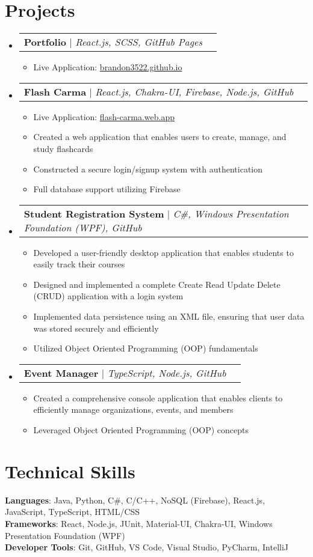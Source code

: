 \documentclass[letterpaper,11pt]{article}
\makeatletter
\newcommand{\resumeItem}[1]{
  \item\small{
    {#1 \vspace{-2pt}}
  }
}
\newcommand{\resumeProjectHeading}[2]{
    \item
    \begin{tabular*}{0.97\textwidth}{l@{\extracolsep{\fill}}r}
      \small#1 & #2 \\
    \end{tabular*}\vspace{-7pt}
}
\newcommand{\resumeSubHeadingListStart}{\begin{itemize}[leftmargin=0.15in, label={}]}
\newcommand{\resumeSubHeadingListEnd}{\end{itemize}}
\newcommand{\resumeItemListStart}{\begin{itemize}}
\newcommand{\resumeItemListEnd}{\end{itemize}\vspace{-5pt}}
\makeatother
\begin{document}
\section{Projects}
    \resumeSubHeadingListStart
      \resumeProjectHeading
          {\textbf{Portfolio} $|$ \emph{React.js, SCSS, GitHub Pages}}{}
					\resumeItemListStart
						\resumeItem{Live Application: \href{https://brandon3522.github.io}{brandon3522.github.io}}
          \resumeItemListEnd
      \resumeProjectHeading
          {\textbf{Flash Carma} $|$ \emph{React.js, Chakra-UI, Firebase, Node.js, GitHub}}{}
          \resumeItemListStart
					\resumeItem{Live Application: \href{https://flash-carma.web.app}{flash-carma.web.app}}
						\resumeItem{Created a web application that enables users to create, manage, and study flashcards}
						\resumeItem{Constructed a secure login/signup system with authentication}
						\resumeItem{Full database support utilizing Firebase}
          \resumeItemListEnd
					\resumeProjectHeading
          {\textbf{Student Registration System} $|$ \emph{C\#, Windows Presentation Foundation (WPF), GitHub}}{}
          \resumeItemListStart
						\resumeItem{Developed a user-friendly desktop application that enables students to easily track their courses}
						\resumeItem{Designed and implemented a complete Create Read Update Delete (CRUD) application with a login system}
						\resumeItem{Implemented data persistence using an XML file, ensuring that user data was stored securely and efficiently}
						\resumeItem{Utilized Object Oriented Programming (OOP) fundamentals}
          \resumeItemListEnd
			\resumeProjectHeading
          {\textbf{Event Manager} $|$ \emph{TypeScript, Node.js, GitHub}}{}
          \resumeItemListStart
						\resumeItem{Created a comprehensive console application that enables clients to efficiently manage organizations, events, and members}
						\resumeItem{Leveraged Object Oriented Programming (OOP) concepts}
          \resumeItemListEnd
    \resumeSubHeadingListEnd



%
\section{Technical Skills}
 \begin{itemize}[leftmargin=0.15in, label={}]
    \small{\item{
     \textbf{Languages}{: Java, Python, C\#, C/C++, NoSQL (Firebase), React.js, JavaScript, TypeScript, HTML/CSS} \\
     \textbf{Frameworks}{: React, Node.js, JUnit, Material-UI, Chakra-UI, Windows Presentation Foundation (WPF)} \\
     \textbf{Developer Tools}{: Git, GitHub, VS Code, Visual Studio, PyCharm, IntelliJ} \\
    }}
 \end{itemize}


\end{document}
